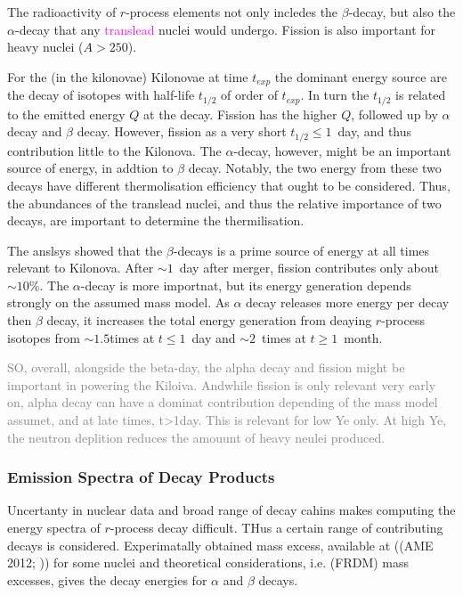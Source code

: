\documentclass[11pt,a4paper,headinclude=true,DIV=14,BCOR=8mm,chapterprefix,listof=totoc,twoside,openright,abstracton]{scrbook}
\newcommand{\magenta}[1]{\textcolor{magenta}{#1}} %
\newcommand{\gray}[1]{\textcolor{gray}{#1}}
\begin{document}
The radioactivity of $r$-process elements not only incledes the $\beta$-decay, but also the $\alpha$-decay that any \magenta{translead} nuclei would undergo. Fission is also important for heavy nuclei ($A>250$).

For the (in the kilonovae) Kilonovae at time $t_{exp}$ the dominant energy source are the decay of isotopes with half-life $t_{1/2}$ of order of $t_{exp}$. In turn the $t_{1/2}$ is related to the emitted energy $Q$ at the decay. Fission has the higher $Q$, followed up by $\alpha$ decay and $\beta$ decay. However, fission as a very short $t_{1/2}\leq1$~day, and thus contribution little to the Kilonova. The $\alpha$-decay, however, might be an important source of energy, in addtion to $\beta$ decay. Notably, the two energy from these two decays have different thermolisation efficiency that ought to be considered. Thus, the abundances of the translead nuclei, and thus the relative importance of two decays, are important to determine the thermilisation.

The anslsys showed that the $\beta$-decays is a prime source of energy at all times relevant to Kilonova. After $\sim1$~day after merger, fission contributes only about $\sim10\%$. The $\alpha$-decay is more importnat, but its energy generation depends strongly on the assumed mass model. As $\alpha$ decay releases more energy per decay then $\beta$ decay, it increases the total energy generation from deaying $r$-process isotopes from $\sim1.5$times at $t\leq1$~day and $\sim2$~times at $t\geq1$~month. 

\gray{SO, overall, alongside the beta-day, the alpha decay and fission might be important in powering the Kiloiva. Andwhile fission is only relevant very early on, alpha decay can have a dominat contribution depending of the mass model assumet, and at late times, t>1day. This is relevant for low Ye only. At high Ye, the neutron deplition reduces the amouunt of heavy neulei produced.}


\subsubsection{Emission Spectra of Decay Products}

Uncertanty in nuclear data and broad range of decay cahins makes computing the energy spectra of $r$-process decay difficult. THus a certain range of contributing decays is considered. 
Experimatally obtained mass excess,  available at ((AME 2012; \cite{Audi et al. 2012; Wang et al. 2012})) for some nuclei and theoretical considerations, i.e. (FRDM) mass excesses, gives the decay energies for $\alpha$ and $\beta$ decays. 
\end{document}
